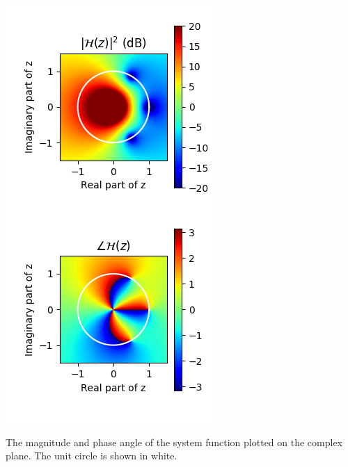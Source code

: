 \begin{marginfigure}
\begin{center}
\includegraphics[width=\textwidth]{code/025_system_function/z_mag_angle.png}
\end{center}
\caption{The magnitude and phase angle of the system function plotted on the complex plane. The unit circle is shown in white.}
\label{fig:third_order_pz}
\end{marginfigure}


